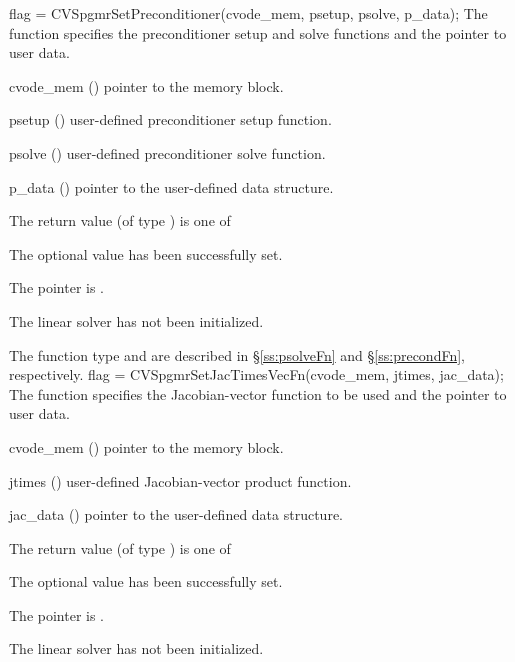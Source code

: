 {
  flag = CVSpgmrSetPreconditioner(cvode\_mem, psetup, psolve, p\_data);
}
{
  The function  specifies the preconditioner
  setup and solve functions and the pointer to user data.
}
{
  \begin{args}
  \item[cvode\_mem] ()
    pointer to the {\cvodes} memory block.
  \item[psetup] ()
    user-defined preconditioner setup function.
  \item[psolve] ()
    user-defined preconditioner solve function.
  \item[p\_data] ()
     pointer to the user-defined data structure.
  \end{args}
}
{
  The return value  (of type ) is one of
  \begin{args}
  \item[\Id{CVSPGMR\_SUCCESS}] 
    The optional value has been successfully set.
  \item[\Id{CVSPGMR\_MEM\_NULL}]
    The  pointer is .
  \item[\Id{CVSPGMR\_LMEM\_NULL}]
    The {\cvspgmr} linear solver has not been initialized.
  \end{args}
}
{
   The function type  and  are
   described in \S\ref{ss:psolveFn} and \S\ref{ss:precondFn}, respectively.
}
{
  flag = CVSpgmrSetJacTimesVecFn(cvode\_mem, jtimes, jac\_data);
}
{
  The function  specifies the Jacobian-vector 
  function to be used and the pointer to user data.
}
{
  \begin{args}
  \item[cvode\_mem] ()
    pointer to the {\cvodes} memory block.
  \item[jtimes] ()
    user-defined Jacobian-vector product function.
  \item[jac\_data] ()
     pointer to the user-defined data structure.
  \end{args}
}
{
  The return value  (of type ) is one of
  \begin{args}
  \item[\Id{CVSPGMR\_SUCCESS}] 
    The optional value has been successfully set.
  \item[\Id{CVSPGMR\_MEM\_NULL}]
    The  pointer is .
  \item[\Id{CVSPGMR\_LMEM\_NULL}]
    The {\cvspgmr} linear solver has not been initialized.
  \end{args}
}
